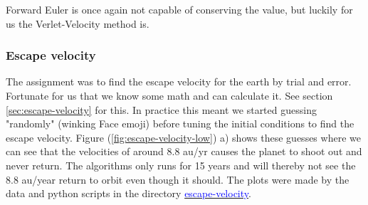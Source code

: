 Forward Euler is once again not capable of conserving the value, but luckily for us the Verlet-Velocity method is. 













\subsubsection{Escape velocity}

The assignment was to find the escape velocity for the earth by trial and error. Fortunate for us that we know some math and can calculate it. See section \ref{sec:escape-velocity} for this. In practice this meant we started guessing "randomly" (winking Face emoji) before tuning the initial conditions to find the escape velocity. Figure (\ref{fig:escape-velocity-low}) a) shows these guesses where we can see that the velocities of around 8.8 au/yr causes the planet to shoot out and never return. 
The algorithms only runs for 15 years and will thereby not see the 8.8 au/year return to orbit even though it should. The plots were made by the data and python scripts in the directory \href{https://github.com/erikfsk/Project-3/tree/master/Project3/escape-velocity}{\textcolor{blue}{escape-velocity}}.

